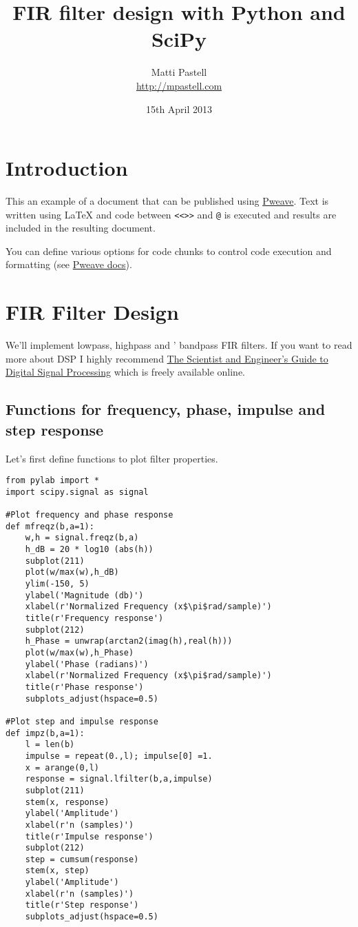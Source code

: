 \documentclass[a4paper,11pt,final]{article}
\title{FIR filter design with Python and SciPy}
\author{Matti Pastell \\ \url{http://mpastell.com}}
\date{15th April 2013}
\begin{document}
\maketitle


\section{Introduction}

This an example of a document that can be published using
\href{http://mpastell.com/pweave}{Pweave}. Text is written
using \LaTeX{} and code between \texttt{<<>>} and \texttt{@} is executed
and results are included in the resulting document.

You can define various options for code chunks to control code
execution and formatting (see
\href{http://mpastell.com/pweave/usage.html\#code-chunk-options}{Pweave
docs}).

\section{FIR Filter Design}

We'll implement lowpass, highpass and ' bandpass FIR filters. If you
want to read more about DSP I highly recommend
\href{http://www.dspguide.com/}{The Scientist and Engineer's Guide to
Digital Signal Processing} which is freely available online.

\subsection{Functions for frequency, phase, impulse and step response}

Let's first define functions to plot filter properties.



\begin{verbatim}
from pylab import *
import scipy.signal as signal

#Plot frequency and phase response
def mfreqz(b,a=1):
    w,h = signal.freqz(b,a)
    h_dB = 20 * log10 (abs(h))
    subplot(211)
    plot(w/max(w),h_dB)
    ylim(-150, 5)
    ylabel('Magnitude (db)')
    xlabel(r'Normalized Frequency (x$\pi$rad/sample)')
    title(r'Frequency response')
    subplot(212)
    h_Phase = unwrap(arctan2(imag(h),real(h)))
    plot(w/max(w),h_Phase)
    ylabel('Phase (radians)')
    xlabel(r'Normalized Frequency (x$\pi$rad/sample)')
    title(r'Phase response')
    subplots_adjust(hspace=0.5)

#Plot step and impulse response
def impz(b,a=1):
    l = len(b)
    impulse = repeat(0.,l); impulse[0] =1.
    x = arange(0,l)
    response = signal.lfilter(b,a,impulse)
    subplot(211)
    stem(x, response)
    ylabel('Amplitude')
    xlabel(r'n (samples)')
    title(r'Impulse response')
    subplot(212)
    step = cumsum(response)
    stem(x, step)
    ylabel('Amplitude')
    xlabel(r'n (samples)')
    title(r'Step response')
    subplots_adjust(hspace=0.5)
\end{verbatim}
\end{document}
